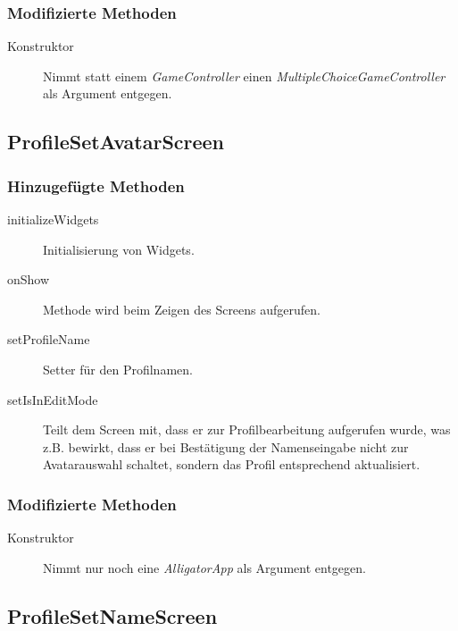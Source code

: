 \subsubsection{Modifizierte Methoden}
\begin{description}
\item[Konstruktor]
Nimmt statt einem \emph{GameController} einen \emph{MultipleChoiceGameController} als Argument entgegen.

\end{description}



\subsection{ProfileSetAvatarScreen}

\subsubsection{Hinzugefügte Methoden}
\begin{description}
\item[initializeWidgets]
Initialisierung von Widgets.
\item[onShow]
Methode wird beim Zeigen des Screens aufgerufen.
\item[setProfileName]
Setter für den Profilnamen.
\item[setIsInEditMode]
Teilt dem Screen mit, dass er zur Profilbearbeitung aufgerufen wurde, was z.B. bewirkt, dass er bei Bestätigung der Namenseingabe nicht zur Avatarauswahl schaltet, sondern das Profil entsprechend aktualisiert.
\end{description}

\subsubsection{Modifizierte Methoden}
\begin{description}
\item[Konstruktor]
Nimmt nur noch eine \emph{AlligatorApp} als Argument entgegen.

\end{description}



\subsection{ProfileSetNameScreen}

